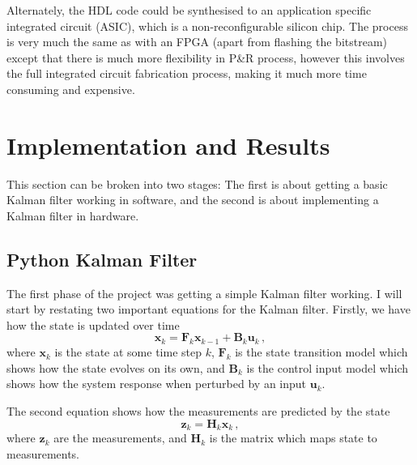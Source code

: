 \documentclass[12pt]{article}
\begin{document}
Alternately, the HDL code could be synthesised to an application specific integrated circuit (ASIC), which is a non-reconfigurable silicon chip. The process is very much the same as with an FPGA (apart from flashing the bitstream) except that there is much more flexibility in P\&R process, however this involves the full integrated circuit fabrication process, making it much more time consuming and expensive.

\section{Implementation and Results}

This section can be broken into two stages: The first is about getting a basic Kalman filter working in software, and the second is about implementing a Kalman filter in hardware.

\subsection{Python Kalman Filter}
The first phase of the project was getting a simple Kalman filter working. I will start by restating two important equations for the Kalman filter. Firstly, we have how the state is updated over time
$$\mathbf{x}_k = \mathbf{F}_k \mathbf{x}_{k-1} + \mathbf{B}_k \mathbf{u}_k \,,$$
where $\mathbf{x}_k$ is the state at some time step $k$, $\mathbf{F}_k$ is the state transition model which shows how the state evolves on its own, and $\mathbf{B}_k$ is the control input model which shows how the system response when perturbed by an input $\mathbf{u}_k$.

The second equation shows how the measurements are predicted by the state
$$\mathbf{z}_k = \mathbf{H}_k \mathbf{x}_k \,,$$
where $\mathbf{z}_k$ are the measurements, and $\mathbf{H}_k$ is the matrix which maps state to measurements.
\end{document}

